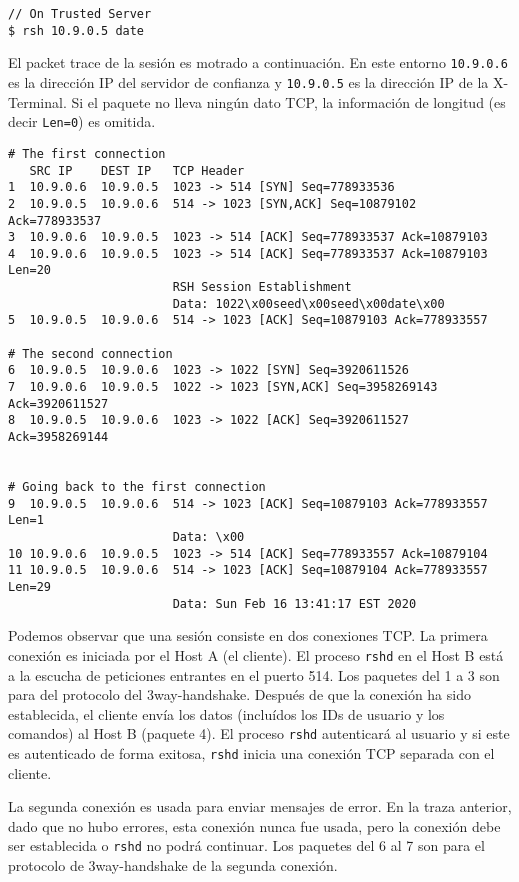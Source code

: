 \begin{lstlisting}
// On Trusted Server
$ rsh 10.9.0.5 date
\end{lstlisting}

El packet trace de la sesión \rsh es motrado a continuación.
En este entorno  \texttt{10.9.0.6} es la dirección IP del servidor de confianza y \texttt{10.9.0.5} es la dirección IP de la X-Terminal.
Si el paquete no lleva ningún dato TCP, la información de longitud (es decir \texttt{Len=0}) es omitida.

\begin{lstlisting}[caption={Packet trace de una sesión \rsh},
                  label={listing:rsh}]
# The first connection
   SRC IP    DEST IP   TCP Header
1  10.9.0.6  10.9.0.5  1023 -> 514 [SYN] Seq=778933536 
2  10.9.0.5  10.9.0.6  514 -> 1023 [SYN,ACK] Seq=10879102 Ack=778933537 
3  10.9.0.6  10.9.0.5  1023 -> 514 [ACK] Seq=778933537 Ack=10879103 
4  10.9.0.6  10.9.0.5  1023 -> 514 [ACK] Seq=778933537 Ack=10879103 Len=20
                       RSH Session Establishment
                       Data: 1022\x00seed\x00seed\x00date\x00
5  10.9.0.5  10.9.0.6  514 -> 1023 [ACK] Seq=10879103 Ack=778933557

# The second connection
6  10.9.0.5  10.9.0.6  1023 -> 1022 [SYN] Seq=3920611526 
7  10.9.0.6  10.9.0.5  1022 -> 1023 [SYN,ACK] Seq=3958269143 Ack=3920611527 
8  10.9.0.5  10.9.0.6  1023 -> 1022 [ACK] Seq=3920611527 Ack=3958269144 


# Going back to the first connection
9  10.9.0.5  10.9.0.6  514 -> 1023 [ACK] Seq=10879103 Ack=778933557 Len=1
                       Data: \x00
10 10.9.0.6  10.9.0.5  1023 -> 514 [ACK] Seq=778933557 Ack=10879104 
11 10.9.0.5  10.9.0.6  514 -> 1023 [ACK] Seq=10879104 Ack=778933557 Len=29
                       Data: Sun Feb 16 13:41:17 EST 2020
\end{lstlisting}

Podemos observar que una sesión \rsh consiste en dos conexiones TCP.
La primera conexión es iniciada por el Host A (el cliente).
El proceso \texttt{rshd} en el Host B está a la escucha de peticiones entrantes en el puerto 514.
Los paquetes del 1 a 3 son para del protocolo del 3way-handshake.
Después de que la conexión ha sido establecida, el cliente envía los datos \rsh (incluídos los IDs de usuario y los comandos) al Host B (paquete 4).
El proceso \texttt{rshd} autenticará al usuario y si este es autenticado de forma exitosa, \texttt{rshd} inicia una conexión TCP separada con el cliente.

La segunda conexión es usada para enviar mensajes de error.
En la traza anterior, dado que no hubo errores, esta conexión nunca fue usada, pero la conexión debe ser establecida o  \texttt{rshd} no podrá continuar. Los paquetes del 6 al 7 son para el protocolo de 3way-handshake de la segunda conexión.

